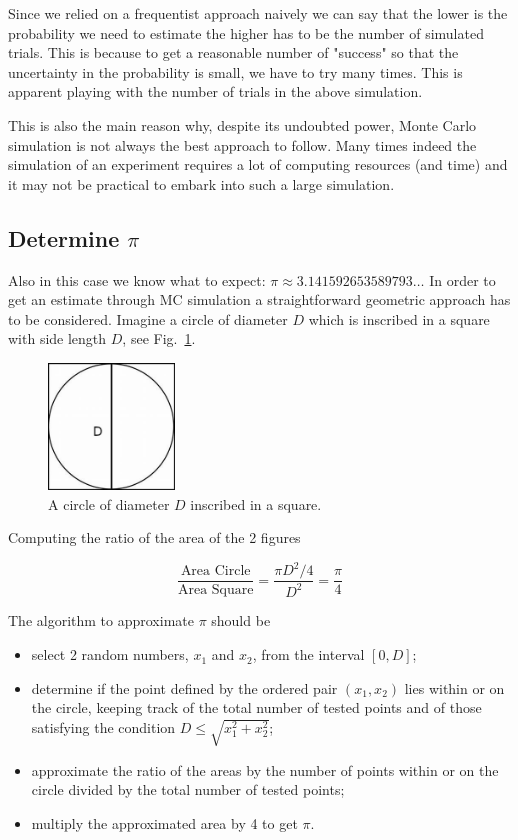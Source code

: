 Since we relied on a frequentist approach naively we can say that the
lower is the probability we need to estimate the higher has to be the
number of simulated trials. This is because to get a reasonable number
of "success" so that the uncertainty in the probability is small, we
have to try many times. This is apparent playing with the number of
trials in the above simulation. 

This is also the main reason why, despite its undoubted power, Monte Carlo simulation is not always the best approach to follow.
Many times indeed the simulation of an experiment requires a lot of computing resources (and time) and it may not be practical to embark into such a large simulation.

\subsection{Determine \(\pi\)}\label{determine-pi}

Also in this case we know what to expect:
\(\pi\approx 3.141592653589793\ldots\) In order to get an estimate through MC
simulation a straightforward geometric approach has to be considered. Imagine a circle of diameter \(D\) which is inscribed in a square with side length \(D\), see Fig.~\ref{fig:circle_inscribed}.

\begin{figure}[htb]
	\centering
	\includegraphics[width=0.3\textwidth]{figures/circle_inscribed.jpeg}
	\caption{A circle of diameter $D$ inscribed in a square.}
	\label{fig:circle_inscribed}
\end{figure}

Computing the ratio of the area of the 2 figures

\begin{equation}
\frac{\textrm{Area Circle}}{\textrm{Area Square}} = \frac{\pi D^2/4}{D^2} = \frac{\pi}{4} 
\end{equation}

The algorithm to approximate \(\pi\) should be

\begin{itemize}
	\item select 2 random numbers, \(x_1\) and \(x_2\), from the interval
\([0,D]\); 
\item determine if the point defined by the ordered pair
\((x_1, x_2)\) lies within or on the circle, keeping track of the total number of
tested points and of those satisfying the condition \(D \le\sqrt{x_1^2 + x_2^2}\); 
\item approximate the ratio of the areas by the number of points within or on
the circle divided by the total number of tested points; 
\item multiply the approximated area by 4 to get \(\pi\).
\end{itemize}


